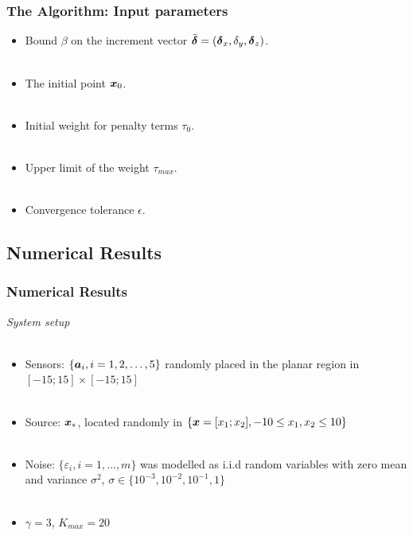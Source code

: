 \documentclass [t] {beamer} %
\begin{document}
\begin{frame} %
\frametitle{The Algorithm: Input parameters}
\phantom{m}
\begin{itemize}
\item
Bound $\beta$ on the increment vector $\tilde{\mbox{\boldmath${\delta}$}} =\left(
\mbox{\boldmath${\delta}$}_x, \delta_y, \mbox{\boldmath${\delta}$}_z\right)$.
\\~\\
\item
The initial point $\mbox{\boldmath$x$}_0$.
\\~\\
\item
Initial weight for penalty terms $\tau_0$.
\\~\\
\item
Upper limit of the weight  $\tau_{max}$.
\\~\\
\item
Convergence tolerance $\epsilon$.
\end{itemize}
\end{frame}



\subsection{Numerical Results}

\begin{frame} %
\frametitle{Numerical Results}
{\large \textit{System setup}}
\\~\\
\begin{itemize}
\item
Sensors: $\{\mbox{\boldmath$a$}_i, i = 1, 2,\ldots,5\}$ randomly placed in the planar region in $[-15;15]\times[-15;15]$
\\~\\
\item
Source: $\mbox{\boldmath$x$}_s$, located randomly in  $\{\mbox{\boldmath$x$}=[x_1;x_2], -10\leq x_1,x_2\leq 10\}$
\\~\\
\item
Noise: $\{\varepsilon_i, i=1,\ldots,m\}$ was modelled as i.i.d random variables with zero mean and variance $\sigma^2$,  $\sigma \in \{10^{-3}, 10^{-2}, 10^{-1}, 1\}$
\\~\\
\item
$\gamma  = 3$, $K_{max} = 20$
\end{itemize}
\end{frame}
\end{document}
